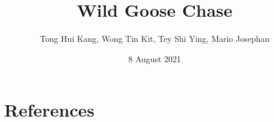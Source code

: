 \documentclass{article}
\title{Wild Goose Chase}
\author{Tong Hui Kang, Wong Tin Kit, Tey Shi Ying, Mario Josephan}
\date{8 August 2021}
\begin{document}
\maketitle



\tableofcontents

\pagebreak




















\section{References}


\end{document}

